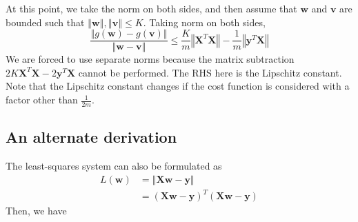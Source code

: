 \documentclass{article}
\begin{document}
At this point, we take the norm on both sides, and then assume that $\textbf{w}$ and $\textbf{v}$ are bounded such that $\left\Vert \textbf{w} \right\Vert, \left\Vert \textbf{v} \right\Vert \leq K$. Taking norm on both sides,
\[
    \boxed{
        \frac{\left\Vert g(\textbf{w}) - g(\textbf{v}) \right\Vert}{\left\Vert \textbf{w} - \textbf{v} \right\Vert} \leq \frac{K}{m}\left\Vert \textbf{X}^T\textbf{X} \right\Vert - \frac{1}{m} \left\Vert\textbf{y}^T \textbf{X} \right\Vert
    }
\]
We are forced to use separate norms because the matrix subtraction $2K \textbf{X}^T\textbf{X} - 2\textbf{y}^T \textbf{X}$ cannot be performed. 
The RHS here is the Lipschitz constant. Note that the Lipschitz constant changes if the cost function is considered with a factor other than $\frac{1}{2m}$.

\subsection{An alternate derivation}
The least-squares system can also be formulated as 
\[
    \begin{aligned} L(\textbf{w}) &= \left\Vert \textbf{X}\textbf{w} - \textbf{y} \right\Vert \\ &= (\textbf{X}\textbf{w} - \textbf{y})^T (\textbf{X}\textbf{w} - \textbf{y}) \end{aligned}
\]
Then, we have
\end{document}
